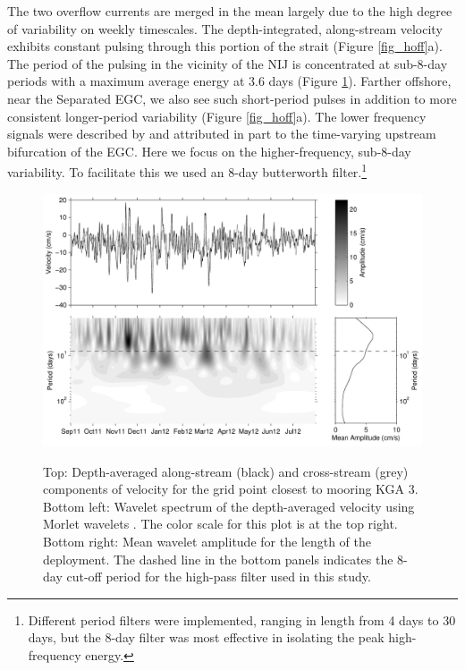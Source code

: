 \documentclass[12pt,titlepage,figuresatend]{article}
\begin{document}
The two overflow currents are merged in the mean largely due to the high degree of variability on weekly timescales. The depth-integrated, along-stream velocity exhibits constant pulsing through this portion of the strait (Figure \ref{fig_hoff}a). The period of the pulsing in the vicinity of the NIJ is concentrated at sub-8-day periods with a maximum average energy at 3.6 days (Figure \ref{fig_waveSpec}). Farther offshore, near the Separated EGC, we also see such short-period pulses in addition to more consistent longer-period variability (Figure \ref{fig_hoff}a). The lower frequency signals were described by \cite{Harden2016} and attributed in part to the time-varying upstream bifurcation of the EGC. Here we focus on the higher-frequency, sub-8-day variability. To facilitate this we used an 8-day butterworth filter.\footnote{Different period filters were implemented, ranging in length from 4 days to 30 days, but the 8-day filter was most effective in isolating the peak high-frequency energy.}

\begin{figure}[ht!]
  \centering\includegraphics[width=\hsize]{./figures/TRWwavelet.pdf}
  \caption{Top: Depth-averaged along-stream (black) and cross-stream (grey) components of velocity for the grid point closest to mooring KGA 3. Bottom left: Wavelet spectrum of the depth-averaged velocity using Morlet wavelets \cite[]{Lilly2017}. The color scale for this plot is at the top right. Bottom right: Mean wavelet amplitude for the length of the deployment. The dashed line in the bottom panels indicates the 8-day cut-off period for the high-pass filter used in this study.}{\label{fig_waveSpec}}
\end{figure}
\end{document}
